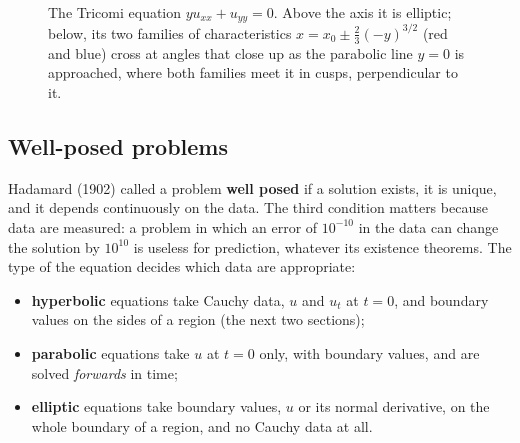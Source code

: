 \documentclass[11pt,a4paper]{article}
\numberwithin{equation}{section}
\theoremstyle{definition}
\begin{document}
\begin{figure}[H]
\caption{The Tricomi equation $yu_{xx} + u_{yy} = 0$. Above the axis it is elliptic; below, its two families of characteristics $x = x_0 \pm \frac23(-y)^{3/2}$ (red and blue) cross at angles that close up as the parabolic line $y = 0$ is approached, where both families meet it
in cusps, perpendicular to it.}
\label{fig:tricomi}
\end{figure}

\subsection{Well-posed problems}
\label{ssec:wellposed}

Hadamard (1902) called a problem \textbf{well posed} if a solution exists, it is unique, and it depends continuously on the data. The third condition matters because data are measured: a problem in which an error of $10^{-10}$ in the data can change the solution by $10^{10}$ is useless
for prediction, whatever its existence theorems. The type of the equation decides which data are appropriate:
\begin{itemize}
\item \textbf{hyperbolic} equations take Cauchy data, $u$ and $u_t$ at $t = 0$, and boundary values on the sides of a region (the next two sections);
\item \textbf{parabolic} equations take $u$ at $t = 0$ only, with boundary values, and are solved \emph{forwards} in time;
\item \textbf{elliptic} equations take boundary values, $u$ or its normal derivative, on the whole boundary of a region, and no Cauchy data at all.
\end{itemize}
\end{document}
